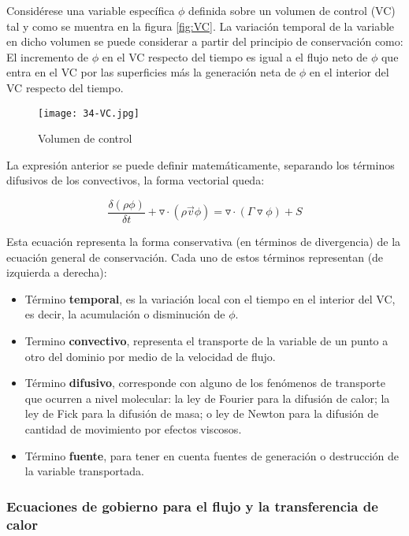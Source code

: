 Considérese una variable específica \(\phi\) definida sobre un volumen
de control (VC) tal y como se muentra en la figura \autoref{fig:VC}. La variación
temporal de la variable en dicho volumen se puede considerar a partir
del principio de conservación como: El incremento de \(\phi\) en el VC
respecto del tiempo es igual a el flujo neto de \(\phi\) que entra en el
VC por las superficies más la generación neta de \(\phi\) en el interior
del VC respecto del tiempo.

\begin{figure}
\centering
\texttt{[image: 34-VC.jpg]}
\caption{Volumen de control}
\label{fig:VC}
\end{figure}

La expresión anterior se puede definir matemáticamente, separando los
términos difusivos de los convectivos, la forma vectorial queda:

\[\frac{\delta\left(\rho\phi\right)}{\delta t}+\triangledown\cdot\left(\rho\overrightarrow{v} \phi \right) = \triangledown \cdot \left( \Gamma \triangledown \phi \right) + S\]

Esta ecuación representa la forma conservativa (en términos de
divergencia) de la ecuación general de conservación. Cada uno de estos
términos representan (de izquierda a derecha):

\begin{itemize}
\item
  Término \textbf{temporal}, es la variación local con el tiempo en el
  interior del VC, es decir, la acumulación o disminución de \(\phi\).
\item
  Termino \textbf{convectivo}, representa el transporte de la variable
  de un punto a otro del dominio por medio de la velocidad de flujo.
\item
  Término \textbf{difusivo}, corresponde con alguno de los fenómenos de
  transporte que ocurren a nivel molecular: la ley de Fourier para la
  difusión de calor; la ley de Fick para la difusión de masa; o ley de
  Newton para la difusión de cantidad de movimiento por efectos
  viscosos.
\item
  Término \textbf{fuente}, para tener en cuenta fuentes de generación o
  destrucción de la variable transportada.
\end{itemize}

\subsubsection{Ecuaciones de gobierno para el flujo y la
transferencia de calor}\label{header-n310}

